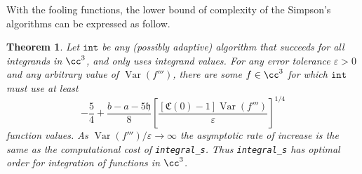 \documentclass{iitthesis}
\DeclareMathOperator{\Var}{Var}
\newtheorem{theorem}{Theorem}
\theoremstyle{definition}
\theoremstyle{remark}
\begin{document}
With the fooling functions, the lower bound of complexity of the Simpson's algorithms can be expressed as follow.
\begin{theorem}\label{compsim}
    Let $\texttt{int}$ be any (possibly adaptive) algorithm that succeeds for all integrands in $\cc^3$, and only uses integrand values. For any error tolerance $\varepsilon > 0$ and any arbitrary value of $\Var(f''')$, there are some $f\in \cc^3$ for which $\texttt{int}$ must use at least
    \begin{equation}\label{complowbdsim}
        -\frac{5}{4}+\frac{b-a-5\mathfrak{h}}{8}\left[\frac{[\mathfrak{C}(0)-1]\Var( f''')}{\varepsilon}\right]^{1/4}
    \end{equation}
    function values. As $\Var(f''')/\varepsilon \rightarrow \infty$ the asymptotic rate of increase is the same as the computational cost of {\tt integral\_s}. Thus {\tt integral\_s} has optimal order for integration of functions in $\cc^3$.
\end{theorem}
\end{document}
